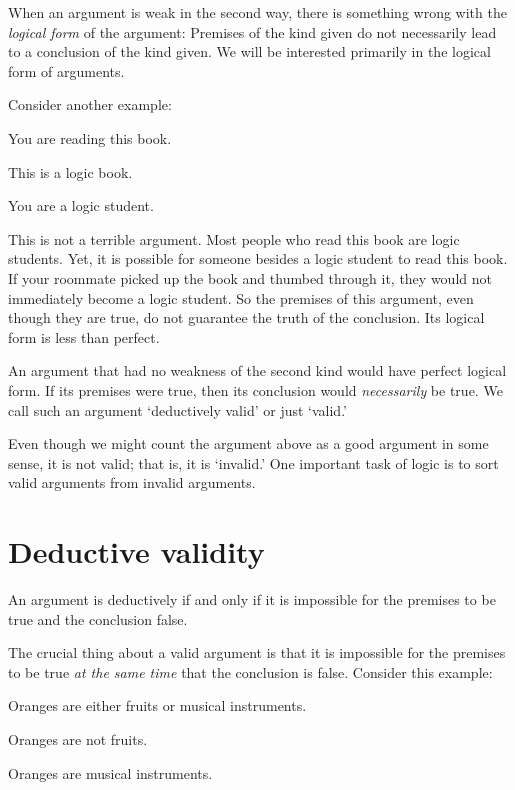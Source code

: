 When an argument is weak in the second way, there is something wrong with the \emph{logical form} of the argument: Premises of the kind given do not necessarily lead to a conclusion of the kind given. We will be interested primarily in the logical form of arguments.

Consider another example:
\begin{earg}
\item[] You are reading this book.
\item[] This is a logic book.
\item[\therefore] You are a logic student.
\end{earg}
This is not a terrible argument. Most people who read this book are logic students. Yet, it is possible for someone besides a logic student to read this book. If your roommate picked up the book and thumbed through it, they would not immediately become a logic student. So the premises of this argument, even though they are true, do not guarantee the truth of the conclusion. Its logical form is less than perfect.

An argument that had no weakness of the second kind would have perfect logical form. If its premises were true, then its conclusion would \emph{necessarily} be true. We call such an argument `deductively valid' or just `valid.'

Even though we might count the argument above as a good argument in some sense, it is not valid; that is, it is `invalid.' One important task of logic is to sort valid arguments from invalid arguments.



\section{Deductive validity}
An argument is deductively  if and only if it is impossible for the premises to be true and the conclusion false.

The crucial thing about a valid argument is that it is impossible for the premises to be true \emph{at the same time} that the conclusion is false. Consider this example:

\begin{earg}
\item[] Oranges are either fruits or musical instruments.
\item[] Oranges are not fruits.
\item[\therefore] Oranges are musical instruments.
\end{earg}


